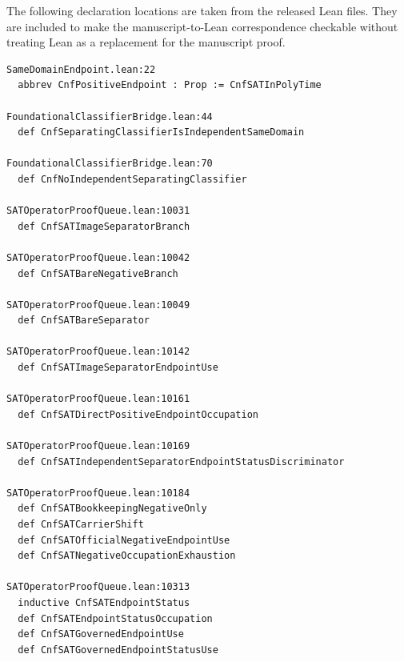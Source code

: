 \documentclass[11pt]{article}
\theoremstyle{definition}
\theoremstyle{remark}
\begin{document}
The following declaration locations are taken from the released Lean files. They are included to make the manuscript-to-Lean correspondence checkable without treating Lean as a replacement for the manuscript proof.
\begin{lstlisting}[basicstyle=\ttfamily\scriptsize]
SameDomainEndpoint.lean:22
  abbrev CnfPositiveEndpoint : Prop := CnfSATInPolyTime

FoundationalClassifierBridge.lean:44
  def CnfSeparatingClassifierIsIndependentSameDomain

FoundationalClassifierBridge.lean:70
  def CnfNoIndependentSeparatingClassifier

SATOperatorProofQueue.lean:10031
  def CnfSATImageSeparatorBranch

SATOperatorProofQueue.lean:10042
  def CnfSATBareNegativeBranch

SATOperatorProofQueue.lean:10049
  def CnfSATBareSeparator

SATOperatorProofQueue.lean:10142
  def CnfSATImageSeparatorEndpointUse

SATOperatorProofQueue.lean:10161
  def CnfSATDirectPositiveEndpointOccupation

SATOperatorProofQueue.lean:10169
  def CnfSATIndependentSeparatorEndpointStatusDiscriminator

SATOperatorProofQueue.lean:10184
  def CnfSATBookkeepingNegativeOnly
  def CnfSATCarrierShift
  def CnfSATOfficialNegativeEndpointUse
  def CnfSATNegativeOccupationExhaustion

SATOperatorProofQueue.lean:10313
  inductive CnfSATEndpointStatus
  def CnfSATEndpointStatusOccupation
  def CnfSATGovernedEndpointUse
  def CnfSATGovernedEndpointStatusUse
\end{lstlisting}
\end{document}
